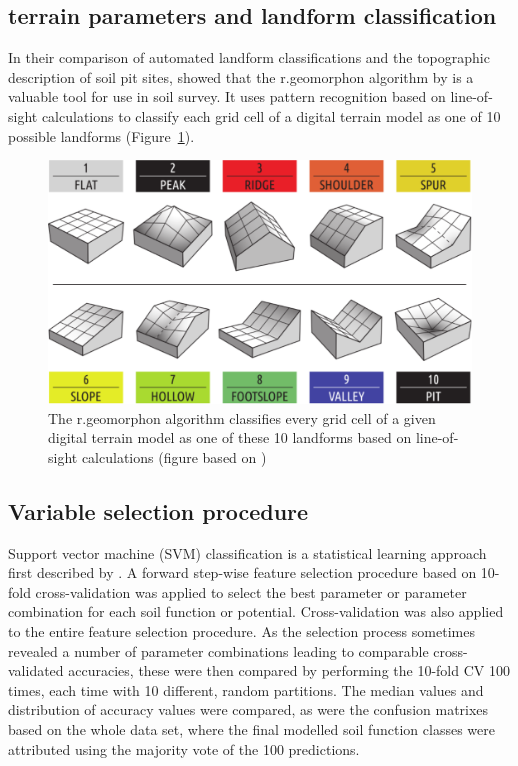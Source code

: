 \documentclass[preprint,12pt,authoryear]{elsarticle}
\begin{document}
\subsection{terrain parameters and landform classification}
In their comparison of automated landform classifications and the topographic description of soil pit sites, \cite{Gruber2017} showed that the r.geomorphon algorithm by \cite{Jasiewicz2013} is a valuable tool for use in soil survey. It uses pattern recognition based on line-of-sight calculations to classify each grid cell of a digital terrain model as one of 10 possible landforms (Figure~\ref{fig:geomorphonlegend}). 
 \begin{figure}[ht!]
\includegraphics[width=\textwidth,angle=0]{legende_geomorphons_cropped.pdf}
\caption{The r.geomorphon algorithm  classifies every grid cell of a given digital terrain model as one of these 10 landforms based on line-of-sight calculations (figure based on \cite{Jasiewicz2013})}
\label{fig:geomorphonlegend}
\end{figure}
\subsection{Variable selection procedure}
Support vector machine (SVM) classification is a statistical learning approach first described by \cite{Cortes1995}.
A forward step-wise feature selection procedure based on 10-fold cross-validation was applied to select the best parameter or parameter combination for each soil function or potential. Cross-validation was also applied to the entire feature selection procedure. As the selection process sometimes revealed a number of parameter combinations leading to comparable cross-validated accuracies, these were then compared by performing the 10-fold CV 100 times, each time with 10 different, random partitions. The median values and distribution of accuracy values were compared, as were the confusion matrixes based on the whole data set, where the final modelled soil function classes were attributed using the majority vote of the 100 predictions.
\end{document}

